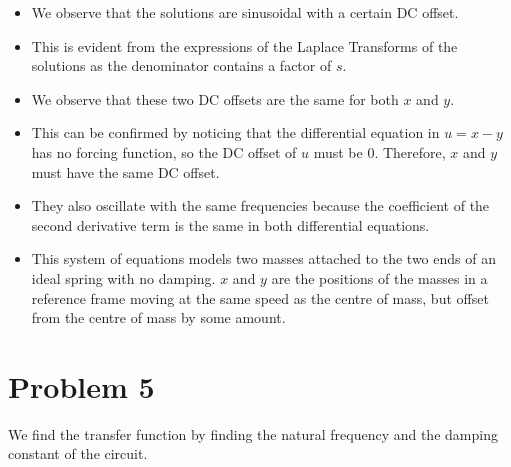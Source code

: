 \documentclass[11pt]{article}
\providecommand{\tightlist}{%
      \setlength{\itemsep}{0pt}\setlength{\parskip}{0pt}}
\begin{document}
    \begin{itemize}
\tightlist
\item
  We observe that the solutions are sinusoidal with a certain DC offset.
\item
  This is evident from the expressions of the Laplace Transforms of the
  solutions as the denominator contains a factor of \(s\).
\item
  We observe that these two DC offsets are the same for both \(x\) and
  \(y\).
\item
  This can be confirmed by noticing that the differential equation in
  \(u = x-y\) has no forcing function, so the DC offset of \(u\) must be
  \(0\). Therefore, \(x\) and \(y\) must have the same DC offset.
\item
  They also oscillate with the same frequencies because the coefficient
  of the second derivative term is the same in both differential
  equations.
\item
  This system of equations models two masses attached to the two ends of
  an ideal spring with no damping. \(x\) and \(y\) are the positions of
  the masses in a reference frame moving at the same speed as the centre
  of mass, but offset from the centre of mass by some amount.
\end{itemize}

	

	
		
    \section{Problem 5}\label{problem-5}

We find the transfer function by finding the natural frequency and the
damping constant of the circuit.

	

	
		
	
	
		
	
		
			
		
	
		
			
		
	
		
			
		
	
		
			
		
	
		
			
		
	
		
			
		
	
		
			
\end{document}
